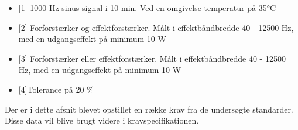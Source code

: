 \begin{itemize}
\item[]{[1] 1000 Hz sinus signal i 10 min. Ved en omgivelse temperatur på 35°C}
\item[]{[2] Forforstærker og effektforstærker. Målt i effektbåndbredde 40 - 12500 Hz, med en udgangseffekt på minimum 10 W}
\item[]{[3] Forforstærker eller effektforstærker. Målt i effektbåndbredde 40 - 12500 Hz, med en udgangseffekt på minimum 10 W}
\item[]{[4]Tolerance på 20 \%}
\end{itemize}

Der er i dette afsnit blevet opstillet en række krav fra de undersøgte standarder. Disse data vil blive brugt videre i kravspecifikationen.
